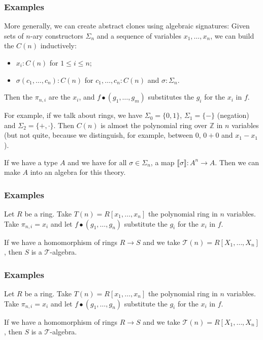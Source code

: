 \documentclass[aspectratio=169]{fancyslides} %
\begin{document}
  \begin{frame}
    \frametitle{Examples}

    More generally, we can create abstract clones using algebraic signatures: Given sets of $ n $-ary constructors $ \Sigma_n $ and a sequence of variables $ x_1, \dots, x_n $, we can build the $ C(n) $ inductively:
    \begin{itemize}
      \item $ x_i : C(n) $ for $ 1 \leq i \leq n $;
      \item $ \sigma(c_1, \dots, c_n) : C(n) $ for $ c_1, \dots, c_n : C(n) $ and $ \sigma: \Sigma_n $.
    \end{itemize}
    Then the $ \pi_{n, i} $ are the $ x_i $, and $ f \bullet (g_1, \dots, g_m) $ substitutes the $ g_i $ for the $ x_i $ in $ f $.

    \pause
    \vfill

    For example, if we talk about rings, we have $ \Sigma_0 = \{ 0, 1 \} $, $ \Sigma_1 = \{ - \} $ (negation) and $ \Sigma_2 = \{ +, \cdot \} $. Then $ C(n) $ is almost the polynomial ring over $ \mathbb Z $ in $ n $ variables (but not quite, because we distinguish, for example, between $ 0 $, $ 0 + 0 $ and $ x_1 - x_1 $).

    \pause
    \vfill

    If we have a type $ A $ and we have for all $ \sigma \in \Sigma_n $, a map $ \llbracket \sigma \rrbracket : A^n \to A $. Then we can make $ A $ into an algebra for this theory.
  \end{frame}

  \begin{frame}
    \frametitle{Examples}
    Let $ R $ be a ring. Take $ T(n) = R[x_1, \dots, x_n] $ the polynomial ring in $ n $ variables. Take $ \pi_{n, i} = x_i $ and let $ f \bullet (g_1, \dots, g_n) $ substitute the $ g_i $ for the $ x_i $ in $ f $.

    \pause
    \vfill

    If we have a homomorphism of rings $ R \to S $ and we take $ \mathcal T(n) = R[X_1, \dots, X_n] $, then $ S $ is a $ \mathcal T $-algebra.
  \end{frame}

  \begin{frame}
    \frametitle{Examples}

    Let $ R $ be a ring. Take $ T(n) = R[x_1, \dots, x_n] $ the polynomial ring in $ n $ variables. Take $ \pi_{n, i} = x_i $ and let $ f \bullet (g_1, \dots, g_n) $ substitute the $ g_i $ for the $ x_i $ in $ f $.

    \pause
    \vfill

    If we have a homomorphism of rings $ R \to S $ and we take $ \mathcal T(n) = R[X_1, \dots, X_n] $, then $ S $ is a $ \mathcal T $-algebra.
  \end{frame}
\end{document}
